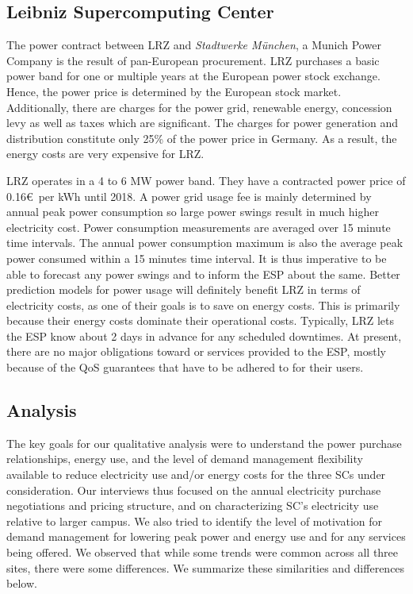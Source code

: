 \subsection{Leibniz Supercomputing Center}
The power contract between LRZ and \emph{Stadtwerke M{\"u}nchen}, a Munich Power Company
is the result of pan-European procurement. LRZ purchases a basic power band for one
or multiple years at the European power stock exchange. Hence, the power price is
determined by the European stock market. Additionally, there are charges for the
power grid, renewable energy, concession levy as well as taxes which are significant.
The charges for power generation and distribution constitute only 25\% of
the power price in Germany. As a result, the energy costs are very expensive for LRZ.

LRZ operates in a 4 to 6 MW power band. They have a contracted power price of 0.16\euro \ per kWh until 2018. A power grid usage fee is mainly determined by annual peak power consumption so large power swings result in much higher electricity cost. Power consumption measurements are averaged over 15 minute time intervals. The annual power consumption maximum is also the average peak power consumed within a 15 minutes time interval. It is thus imperative to be able to forecast any power swings and to inform the ESP about
the same. Better prediction models for power usage will definitely benefit
LRZ in terms of electricity costs, as one of their goals is to save on
energy costs. This is primarily because their energy costs dominate their
operational costs. Typically, LRZ lets the ESP know about 2 days in
advance for any scheduled downtimes. At present, there are no major
obligations toward or services provided to the ESP, mostly because of
the QoS guarantees that have to be adhered to for their users.

\subsection{Analysis}
The key goals for our qualitative analysis were to understand the power purchase relationships, energy use, and the level of demand management flexibility available to reduce electricity use and/or energy costs for the three SCs under consideration. Our interviews thus focused on the annual electricity purchase negotiations and pricing structure, and on characterizing SC's electricity use relative to larger campus. We also tried to identify the level of motivation for demand management for lowering peak power and energy use and for any services being offered. We observed that while some trends were common across all three sites, there were some differences. We summarize these similarities and differences below. \\

